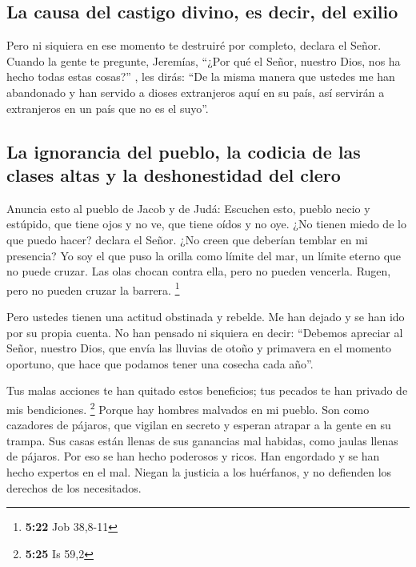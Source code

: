 \hypertarget{la-causa-del-castigo-divino-es-decir-del-exilio}{%
\subsection{La causa del castigo divino, es decir, del
exilio}\label{la-causa-del-castigo-divino-es-decir-del-exilio}}

 Pero ni siquiera en ese momento te destruiré por
completo, declara el Señor.  Cuando la gente te pregunte,
Jeremías, ``¿Por qué el Señor, nuestro Dios, nos ha hecho todas estas
cosas?'' , les dirás: ``De la misma manera que ustedes me han abandonado
y han servido a dioses extranjeros aquí en su país, así servirán a
extranjeros en un país que no es el suyo''.

\hypertarget{la-ignorancia-del-pueblo-la-codicia-de-las-clases-altas-y-la-deshonestidad-del-clero}{%
\subsection{La ignorancia del pueblo, la codicia de las clases altas y
la deshonestidad del
clero}\label{la-ignorancia-del-pueblo-la-codicia-de-las-clases-altas-y-la-deshonestidad-del-clero}}

 Anuncia esto al pueblo de Jacob y de Judá:
 Escuchen esto, pueblo necio y estúpido, que tiene ojos y
no ve, que tiene oídos y no oye.  ¿No tienen miedo de lo
que puedo hacer? declara el Señor. ¿No creen que deberían temblar en mi
presencia? Yo soy el que puso la orilla como límite del mar, un límite
eterno que no puede cruzar. Las olas chocan contra ella, pero no pueden
vencerla. Rugen, pero no pueden cruzar la barrera. \footnote{\textbf{5:22}
  Job 38,8-11}

 Pero ustedes tienen una actitud obstinada y rebelde. Me
han dejado y se han ido por su propia cuenta.  No han
pensado ni siquiera en decir: ``Debemos apreciar al Señor, nuestro Dios,
que envía las lluvias de otoño y primavera en el momento oportuno, que
hace que podamos tener una cosecha cada año''.

 Tus malas acciones te han quitado estos beneficios; tus
pecados te han privado de mis bendiciones. \footnote{\textbf{5:25} Is
  59,2}  Porque hay hombres malvados en mi pueblo. Son
como cazadores de pájaros, que vigilan en secreto y esperan atrapar a la
gente en su trampa.  Sus casas están llenas de sus
ganancias mal habidas, como jaulas llenas de pájaros. Por eso se han
hecho poderosos y ricos.  Han engordado y se han hecho
expertos en el mal. Niegan la justicia a los huérfanos, y no defienden
los derechos de los necesitados.


